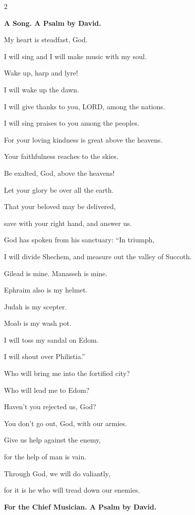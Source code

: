 \begin{multicols}{2}
	
	\mychapter{}\textbf{A Song. A Psalm by David.}
	
	\quad\quad\quad \myverse*{}My heart is steadfast, God.
	
	I will sing and I will make music with my soul.
	
	
	\myverse{}Wake up, harp and lyre!
	
	I will wake up the dawn.
	
	
	\myverse{}I will give thanks to you, LORD, among the nations.
	
	I will sing praises to you among the peoples.
	
	
	\myverse{}For your loving kindness is great above the heavens.
	
	Your faithfulness reaches to the skies.
	
	
	\myverse{}Be exalted, God, above the heavens!
	
	Let your glory be over all the earth.
	
	
	\myverse{}That your beloved may be delivered,
	
	save with your right hand, and answer us.
	
	
	\myverse{}God has spoken from his sanctuary: “In triumph,
	
	I will divide Shechem, and measure out the valley of Succoth.
	
	
	\myverse{}Gilead is mine. Manasseh is mine.
	
	Ephraim also is my helmet.
	
	Judah is my scepter.
	
	
	\myverse{}Moab is my wash pot.
	
	I will toss my sandal on Edom.
	
	I will shout over Philistia.”
	
	
	\myverse{}Who will bring me into the fortified city?
	
	Who will lead me to Edom?
	
	
	\myverse{}Haven’t you rejected us, God?
	
	You don’t go out, God, with our armies.
	
	
	\myverse{}Give us help against the enemy,
	
	for the help of man is vain.
	
	
	\myverse{}Through God, we will do valiantly,
	
	for it is he who will tread down our enemies.
	
	
	\mychapter{}\textbf{For the Chief Musician. A Psalm by David.}
	

\end{multicols}
